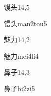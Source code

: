 \begin{entry}{馒头}{14,5}
  \begin{phonetics}{馒头}{man2tou5}
  \end{phonetics}
\end{entry}

\begin{entry}{魅力}{14,2}
  \begin{phonetics}{魅力}{mei4li4}
  \end{phonetics}
\end{entry}

\begin{entry}{鼻子}{14,3}
  \begin{phonetics}{鼻子}{bi2zi5}
  \end{phonetics}
\end{entry}


